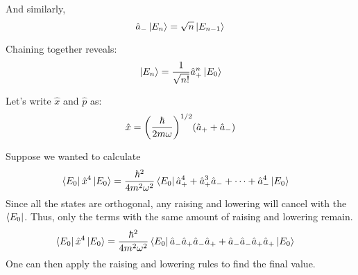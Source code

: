 And similarly,
\[ \hat{a}_{-} \ket*{E_n} = \sqrt{n} \ket*{E_{n - 1}} \]

Chaining together reveals:
\[ \ket*{E_n} = \frac{1}{\sqrt{n!}} \hat{a}_{+}^n \ket*{E_0} \]

Let's write $\hat{x}$ and $\hat{p}$ as:
\[ \hat{x} = \qty(\frac{\hbar}{2 m \omega})^{1/2} (\hat{a}_{+} + \hat{a}_{-}) \]

Suppose we wanted to calculate
\begin{align*}
    \bra{E_0} \hat{x}^4 \ket*{E_0} &= \frac{\hbar^2}{4 m^2 \omega^2} \bra{E_0}\hat{a}_{+}^4 + \hat{a}_{+}^3 \hat{a}_{-} + \dots + \hat{a}_{-}^4 \ket*{E_0}
\end{align*} 
Since all the states are orthogonal, any raising and lowering will cancel with the $\bra{E_0}$. Thus,
only the terms with the same amount of raising and lowering remain.
\begin{align*}
    \bra{E_0} \hat{x}^4 \ket*{E_0} &= \frac{\hbar^2}{4m^2 \omega^2} \bra{E_0}\hat{a}_{-}\hat{a}_{+}\hat{a}_{-}\hat{a}_{+} + \hat{a}_{-}\hat{a}_{-}\hat{a}_{+}\hat{a}_{+}\ket{E_0}
\end{align*}
One can then apply the raising and lowering rules to find the final value.